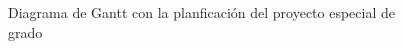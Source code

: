 \begin{figure}[!ht]
\begin{center}


\end{center}
\caption{Diagrama de Gantt con la planficación del proyecto especial de grado}
\end{figure}


	